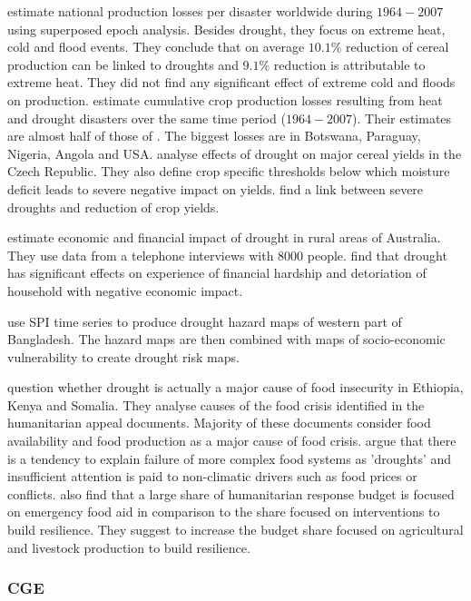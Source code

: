 \documentclass[a4paper,12pt]{article}
\begin{document}
 \cite{Pedram2016} estimate national production losses per disaster worldwide during ${1964-2007}$ using superposed epoch analysis. Besides drought, they focus on extreme heat, cold and flood events. They conclude that on average $10.1\%$ reduction of cereal production can be linked to droughts and $9.1\%$ reduction is attributable to extreme heat. They did not find any significant effect of extreme cold and floods on production. \cite{Mehrabi2017} estimate cumulative crop production losses resulting from heat and drought disasters over the same time period (${1964-2007}$). Their estimates are almost half of those of \cite{Pedram2016}. The biggest losses are in Botswana, Paraguay, Nigeria, Angola and USA. \cite{HLAVINKA2009} analyse effects of drought on major cereal yields in the Czech Republic. They also define crop specific thresholds below which moisture deficit leads to severe negative impact on yields. \cite{HLAVINKA2009} find a link between severe droughts and reduction of crop yields.


 \cite{edwards2009} estimate economic and financial impact of drought in rural areas of Australia. They use data from a telephone interviews with $8000$ people. \cite{edwards2009} find that drought has significant effects on experience of financial hardship and detoriation of household with negative economic impact.	


\cite{shahid2008} use SPI time series to produce drought hazard maps of western part of Bangladesh. The hazard maps are then combined with maps of socio-economic vulnerability to create drought risk maps. 
 
 \cite{Sandstorm2017} question whether drought is actually a major cause of food insecurity in Ethiopia, Kenya and Somalia. They analyse causes of the food crisis identified in the humanitarian appeal documents. Majority of these documents consider food availability and food production as a major cause of food crisis. \cite{Sandstorm2017} argue that there is a tendency to explain failure of more complex food systems as 'droughts' and insufficient attention is paid to non-climatic drivers such as food prices or conflicts.  \cite{Sandstorm2017} also find that a large share of humanitarian response budget is focused on emergency food aid in comparison to the share focused on interventions to build resilience. They suggest to increase the budget share focused on agricultural and livestock production to build resilience. 

 
\subsubsection*{CGE}
\end{document}
